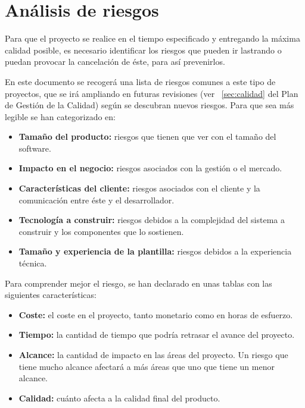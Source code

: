 \section{Análisis de riesgos}\label{sec:riesgos}
\par Para que el proyecto se realice en el tiempo especificado y entregando la máxima calidad posible, es necesario identificar los riesgos que pueden ir lastrando o puedan provocar la cancelación de éste, para así prevenirlos.
\par En este documento se recogerá una lista de riesgos comunes a este tipo de proyectos, que se irá ampliando en futuras revisiones (ver ~\ref{sec:calidad} del Plan de Gestión de la Calidad) según se descubran nuevos riesgos. Para que sea más legible se han categorizado en:

\begin{itemize}[-]
\item \textbf{Tamaño del producto:} riesgos que tienen que ver con el tamaño del software.
\item \textbf{Impacto en el negocio:} riesgos asociados con  la gestión o el mercado.
\item \textbf{Características del cliente:} riesgos asociados con el cliente y la comunicación entre éste y el desarrollador.
\item \textbf{Tecnología a construir:} riesgos debidos a la complejidad del sistema a construir y los componentes que lo sostienen.
\item \textbf{Tamaño y experiencia de la plantilla:} riesgos debidos a la experiencia técnica.
\end{itemize}

\par Para comprender mejor el riesgo, se han declarado en unas tablas con las siguientes características:
\begin{itemize}
	\item \textbf{Coste:} el coste en el proyecto, tanto monetario como en horas de esfuerzo.
	\item \textbf{Tiempo:} la cantidad de tiempo que podría retrasar el avance del proyecto.
	\item \textbf{Alcance:} la cantidad de impacto en las áreas del proyecto. Un riesgo que tiene mucho alcance afectará a más áreas que uno que tiene un menor alcance.
	\item \textbf{Calidad:} cuánto afecta a la calidad final del producto.
\end{itemize}


